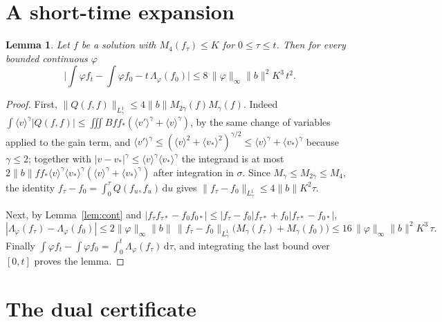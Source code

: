 \documentclass[11pt]{amsart}
\newtheorem{lemma}[theorem]{Lemma}
\theoremstyle{definition}
\newcommand{\dd}{\,\mathrm{d}}
\newcommand{\jb}[1]{\langle #1\rangle}
\newcommand{\nb}{\|b\|}
\begin{document}
\section{A short-time expansion}\label{sec:expansion}

\begin{lemma}\label{lem:expansion}
Let $f$ be a solution with $M_4(f_\tau)\le K$ for $0\le\tau\le t$. Then for every bounded continuous $\varphi$
\[
\Big|\int\varphi f_t-\int\varphi f_0-t\,\Lambda_\varphi(f_0)\Big|\le 8\,\|\varphi\|_\infty\nb^2K^3\,t^2 .
\]
\end{lemma}

\begin{proof}
First, $\|Q(f,f)\|_{L^1_\gamma}\le4\nb M_{2\gamma}(f)M_\gamma(f)$. Indeed $\int\jb{v}^\gamma|Q(f,f)|\le\iiint Bff_*(\jb{v'}^\gamma+\jb{v}^\gamma)$, by the same change of variables applied to the gain term, and $\jb{v'}^\gamma\le(\jb{v}^2+\jb{v_*}^2)^{\gamma/2}\le\jb{v}^\gamma+\jb{v_*}^\gamma$ because $\gamma\le2$; together with $|v-v_*|^\gamma\le\jb{v}^\gamma\jb{v_*}^\gamma$ the integrand is at most $2\nb ff_*\jb{v}^\gamma\jb{v_*}^\gamma(\jb{v}^\gamma+\jb{v_*}^\gamma)$ after integration in $\sigma$. Since $M_\gamma\le M_{2\gamma}\le M_4$, the identity $f_\tau-f_0=\int_0^\tau Q(f_u,f_u)\dd u$ gives $\|f_\tau-f_0\|_{L^1_\gamma}\le4\nb K^2\tau$.

Next, by Lemma~\ref{lem:cont} and $|f_\tau f_{\tau*}-f_0f_{0*}|\le|f_\tau-f_0|f_{\tau*}+f_0|f_{\tau*}-f_{0*}|$,
\[
|\Lambda_\varphi(f_\tau)-\Lambda_\varphi(f_0)|\le 2\|\varphi\|_\infty\nb\,\|f_\tau-f_0\|_{L^1_\gamma}\big(M_\gamma(f_\tau)+M_\gamma(f_0)\big)\le16\,\|\varphi\|_\infty\nb^2K^3\,\tau .
\]
Finally $\int\varphi f_t-\int\varphi f_0=\int_0^t\Lambda_\varphi(f_\tau)\dd\tau$, and integrating the last bound over $[0,t]$ proves the lemma.
\end{proof}

\section{The dual certificate}\label{sec:dual}
\end{document}
